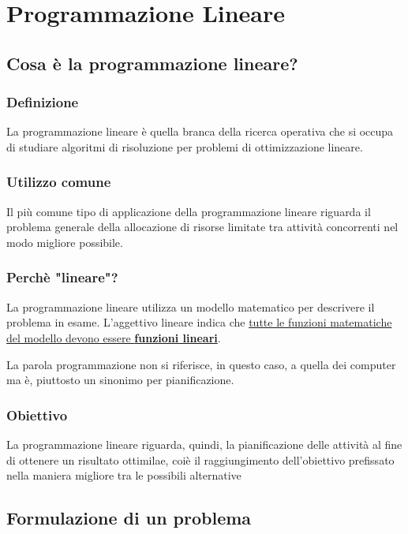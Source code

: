 \chapter{Programmazione Lineare}

\section{Cosa è la programmazione lineare?}
\subsection{Definizione}
La programmazione lineare è quella branca della ricerca operativa che si occupa di studiare algoritmi di risoluzione per problemi di ottimizzazione lineare.

\subsection{Utilizzo comune}
Il più comune tipo di applicazione della programmazione lineare riguarda il problema generale della allocazione di risorse limitate tra attività concorrenti nel modo migliore possibile.

\subsection{Perchè "lineare"?}
La programmazione lineare utilizza un modello matematico per descrivere il problema in esame.
L'aggettivo lineare indica che \uline{tutte le funzioni matematiche del modello devono essere \textbf{funzioni lineari}}.

La parola programmazione non si riferisce, in questo caso, a quella dei computer ma è, piuttosto un sinonimo per pianificazione.

\subsection{Obiettivo}
La programmazione lineare riguarda, quindi, la pianificazione delle attività al fine di ottenere un risultato ottimilae, coiè il raggiungimento dell'obiettivo prefissato nella maniera migliore tra le possibili alternative


\newpage
\section{Formulazione di un problema}
